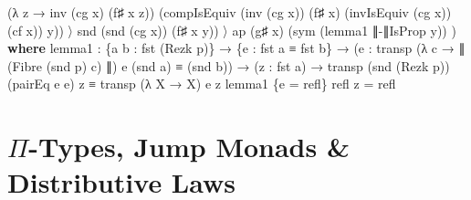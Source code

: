 \documentclass[
  11pt,
  oneside,
  article]{memoir}
\newenvironment{Shaded}{}{}
\newcommand{\KeywordTok}[1]{\textcolor[rgb]{0.00,0.44,0.13}{\textbf{#1}}}
\newcommand{\NormalTok}[1]{#1}
\newcommand{\OtherTok}[1]{\textcolor[rgb]{0.00,0.44,0.13}{#1}}
\theoremstyle{definition}
\theoremstyle{plain}
\newcommand{\0}{\textsf{0}}
\newcommand{\1}{\tn{\textsf{1}}}
\begin{document}
\begin{Shaded}
\begin{Highlighting}[]
                             \OtherTok{(λ}\NormalTok{ z }\OtherTok{→}\NormalTok{ inv }\OtherTok{(}\NormalTok{cg x}\OtherTok{)} \OtherTok{(}\NormalTok{f♯ x z}\OtherTok{))} 
                             \OtherTok{(}\NormalTok{compIsEquiv }\OtherTok{(}\NormalTok{inv }\OtherTok{(}\NormalTok{cg x}\OtherTok{))} \OtherTok{(}\NormalTok{f♯ x}\OtherTok{)} 
                                          \OtherTok{(}\NormalTok{invIsEquiv }\OtherTok{(}\NormalTok{cg x}\OtherTok{))} \OtherTok{(}\NormalTok{cf x}\OtherTok{))} 
\NormalTok{                             y}\OtherTok{))}\NormalTok{ 〉 }
\NormalTok{                    snd }\OtherTok{(}\NormalTok{snd }\OtherTok{(}\NormalTok{cg x}\OtherTok{))} \OtherTok{(}\NormalTok{f♯ x y}\OtherTok{))}\NormalTok{ 〉 }
\NormalTok{            ap }\OtherTok{(}\NormalTok{g♯ x}\OtherTok{)} \OtherTok{(}\NormalTok{sym }\OtherTok{(}\NormalTok{lemma1 ∥{-}∥IsProp y}\OtherTok{))} \OtherTok{)}
    \KeywordTok{where}\NormalTok{ lemma1 }\OtherTok{:} \OtherTok{\{}\NormalTok{a b }\OtherTok{:}\NormalTok{ fst }\OtherTok{(}\NormalTok{Rezk p}\OtherTok{)\}}
                   \OtherTok{→} \OtherTok{\{}\NormalTok{e }\OtherTok{:}\NormalTok{ fst a ≡ fst b}\OtherTok{\}} 
                   \OtherTok{→} \OtherTok{(}\NormalTok{e\textquotesingle{} }\OtherTok{:}\NormalTok{ transp }\OtherTok{(λ}\NormalTok{ c }\OtherTok{→}\NormalTok{ ∥ }\OtherTok{(}\NormalTok{Fibre }\OtherTok{(}\NormalTok{snd p}\OtherTok{)}\NormalTok{ c}\OtherTok{)}\NormalTok{ ∥}\OtherTok{)} 
\NormalTok{                                  e }\OtherTok{(}\NormalTok{snd a}\OtherTok{)} 
\NormalTok{                           ≡ }\OtherTok{(}\NormalTok{snd b}\OtherTok{))}
                   \OtherTok{→} \OtherTok{(}\NormalTok{z }\OtherTok{:}\NormalTok{ fst a}\OtherTok{)}
                   \OtherTok{→}\NormalTok{ transp }\OtherTok{(}\NormalTok{snd }\OtherTok{(}\NormalTok{Rezk p}\OtherTok{))} \OtherTok{(}\NormalTok{pairEq e e\textquotesingle{}}\OtherTok{)}\NormalTok{ z}
\NormalTok{                     ≡ transp }\OtherTok{(λ}\NormalTok{ X }\OtherTok{→}\NormalTok{ X}\OtherTok{)}\NormalTok{ e z}
\NormalTok{          lemma1 }\OtherTok{\{}\NormalTok{e }\OtherTok{=}\NormalTok{ refl}\OtherTok{\}}\NormalTok{ refl z }\OtherTok{=}\NormalTok{ refl}
\end{Highlighting}
\end{Shaded}

\chapter{\texorpdfstring{\(\Pi\)-Types, Jump Monads \& Distributive
Laws}{\textbackslash Pi-Types, Jump Monads \& Distributive Laws}}\label{pi-types-jump-monads-distributive-laws}
\end{document}
